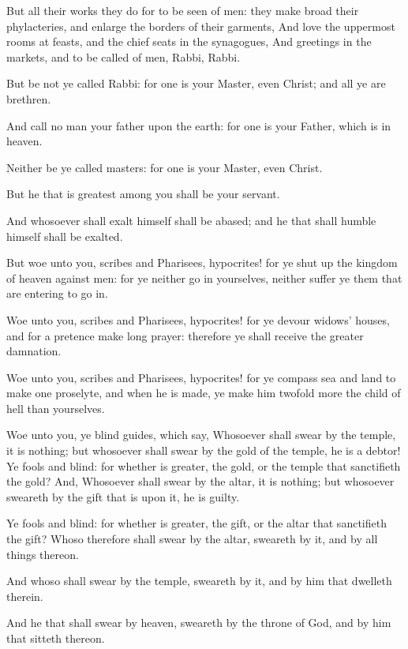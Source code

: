 \Verse But all their works they do for to be seen of men: they make broad their phylacteries, and enlarge the borders of their garments, \Verse And love the uppermost rooms at feasts, and the chief seats in the synagogues, \Verse And greetings in the markets, and to be called of men, Rabbi, Rabbi.

\Verse But be not ye called Rabbi: for one is your Master, even Christ; and all ye are brethren.

\Verse And call no man your father upon the earth: for one is your Father, which is in heaven.

\Verse Neither be ye called masters: for one is your Master, even Christ.

\Verse But he that is greatest among you shall be your servant.

\Verse And whosoever shall exalt himself shall be abased; and he that shall humble himself shall be exalted.

\Verse But woe unto you, scribes and Pharisees, hypocrites! for ye shut up the kingdom of heaven against men: for ye neither go in yourselves, neither suffer ye them that are entering to go in.

\Verse Woe unto you, scribes and Pharisees, hypocrites! for ye devour widows' houses, and for a pretence make long prayer: therefore ye shall receive the greater damnation.

\Verse Woe unto you, scribes and Pharisees, hypocrites! for ye compass sea and land to make one proselyte, and when he is made, ye make him twofold more the child of hell than yourselves.

\Verse Woe unto you, ye blind guides, which say, Whosoever shall swear by the temple, it is nothing; but whosoever shall swear by the gold of the temple, he is a debtor!  \Verse Ye fools and blind: for whether is greater, the gold, or the temple that sanctifieth the gold?  \Verse And, Whosoever shall swear by the altar, it is nothing; but whosoever sweareth by the gift that is upon it, he is guilty.

\Verse Ye fools and blind: for whether is greater, the gift, or the altar that sanctifieth the gift?  \Verse Whoso therefore shall swear by the altar, sweareth by it, and by all things thereon.

\Verse And whoso shall swear by the temple, sweareth by it, and by him that dwelleth therein.

\Verse And he that shall swear by heaven, sweareth by the throne of God, and by him that sitteth thereon.

